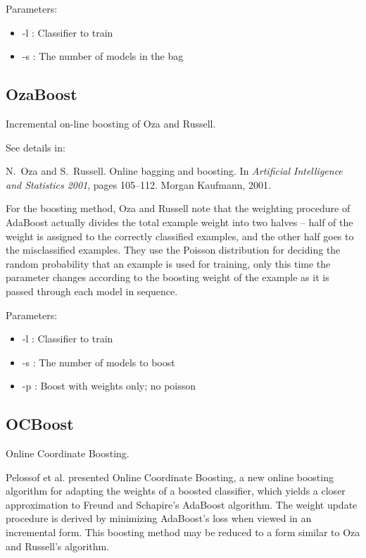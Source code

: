 \documentclass[a4paper,12pt,twoside]{book}
\begin{document}
Parameters:
\begin{itemize}
\item -l : Classifier to train
\item -s : The number of models in the bag
\end{itemize}

\subsection{OzaBoost} Incremental on-line boosting of Oza and Russell.

See details in:

\begin{itemize}
N.~Oza and S.~Russell.
\newblock Online bagging and boosting.
\newblock In {\em Artificial Intelligence and Statistics 2001}, pages 105--112.
  Morgan Kaufmann, 2001.
\end{itemize}

For the boosting method, Oza and Russell 
note that the weighting procedure of AdaBoost actually divides the total example 
weight into two halves \--- half of the weight is assigned to the correctly
classified examples, and the other half goes to the misclassified examples. %
They use the Poisson distribution for 
deciding the random probability that an example is used for training, only this time
the parameter changes according to the boosting weight of the example
as it is passed through each model in sequence.

Parameters:
\begin{itemize}
\item -l : Classifier to train
\item -s : The number of models to boost
\item -p : Boost with weights only; no poisson
\end{itemize}

\subsection{OCBoost} Online Coordinate Boosting.

Pelossof et al. presented  Online Coordinate Boosting, a new
online boosting algorithm for adapting the weights of a boosted classifier, which
yields a closer approximation to Freund and Schapire's AdaBoost algorithm.
The weight update procedure is derived by minimizing AdaBoost's loss when viewed in an incremental
form. This boosting method may be reduced to a form similar to Oza and Russell's algorithm.
\end{document}
